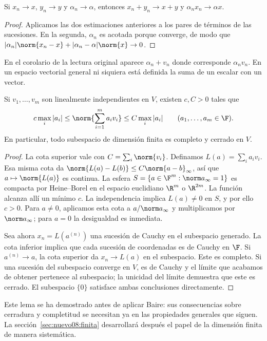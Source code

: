 \begin{corolario}\label{ch19:limites}
Si $x_n\to x$, $y_n\to y$ y $\alpha_n\to\alpha$, entonces $x_n+y_n\to x+y$ y $\alpha_nx_n\to\alpha x$.
\end{corolario}
\begin{proof}
Aplicamos las dos estimaciones anteriores a los pares de términos de las sucesiones. En la segunda, $\alpha_n$ es acotada porque converge, de modo que $|\alpha_n|\norm{x_n-x}+|\alpha_n-\alpha|\norm{x}\to0$.
\end{proof}

\begin{observacion}
En el corolario de la lectura original aparece $\alpha_n+v_n$ donde corresponde $\alpha_nv_n$. En un espacio vectorial general ni siquiera está definida la suma de un escalar con un vector.
\end{observacion}

\begin{lema}\label{ch19:coordenadas}
Si $v_1,\ldots,v_m$ son linealmente independientes en $V$, existen $c,C>0$ tales que
\[
 c\max_i|a_i|\leq\norm{\sum_{i=1}^m a_iv_i}\leq C\max_i|a_i|
 \qquad(a_1,\ldots,a_m\in\F).
\]
En particular, todo subespacio de dimensión finita es completo y cerrado en $V$.
\end{lema}
\begin{proof}
La cota superior vale con $C=\sum_i\norm{v_i}$. Definamos $L(a)=\sum_i a_iv_i$. Esa misma cota da $\norm{L(a)-L(b)}\leq C\norm{a-b}_\infty$, así que $a\mapsto\norm{L(a)}$ es continua. La esfera $S=\{a\in\F^m:\norm a_\infty=1\}$ es compacta por Heine--Borel en el espacio euclidiano $\R^m$ o $\R^{2m}$. La función alcanza allí un mínimo $c$. La independencia implica $L(a)\ne0$ en $S$, y por ello $c>0$. Para $a\ne0$, aplicamos esta cota a $a/\norm a_\infty$ y multiplicamos por $\norm a_\infty$; para $a=0$ la desigualdad es inmediata.

Sea ahora $x_n=L(a^{(n)})$ una sucesión de Cauchy en el subespacio generado. La cota inferior implica que cada sucesión de coordenadas es de Cauchy en $\F$. Si $a^{(n)}\to a$, la cota superior da $x_n\to L(a)$ en el subespacio. Este es completo. Si una sucesión del subespacio converge en $V$, es de Cauchy y el límite que acabamos de obtener pertenece al subespacio; la unicidad del límite demuestra que este es cerrado. El subespacio $\{0\}$ satisface ambas conclusiones directamente.
\end{proof}

Este lema se ha demostrado antes de aplicar Baire: sus consecuencias sobre cerradura y completitud se necesitan ya en las propiedades generales que siguen. La sección~\ref{sec:nuevo08:finita} desarrollará después el papel de la dimensión finita de manera sistemática.

